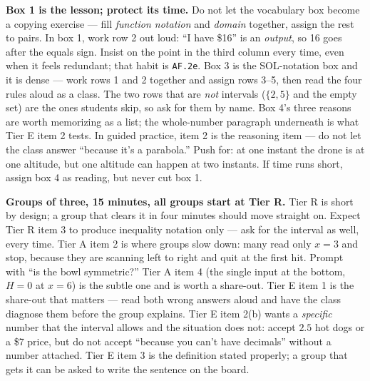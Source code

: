 \documentclass[10pt]{article}
\begin{document}
\boxguard[18]
\begin{teachernote}
    \textbf{Box 1 is the lesson; protect its time.} Do not let the vocabulary box become a copying
    exercise --- fill \emph{function notation} and \emph{domain} together, assign the rest to pairs.
    In box 1, work row 2 out loud: ``I have \$16'' is an \emph{output}, so 16 goes after the equals
    sign. Insist on the point in the third column every time, even when it feels redundant; that
    habit is \texttt{AF.2e}. Box 3 is the SOL-notation box and it is dense --- work rows 1 and 2
    together and assign rows 3--5, then read the four rules aloud as a class. The two rows that are
    \emph{not} intervals ($\{2,5\}$ and the empty set) are the ones students skip, so ask for them
    by name. Box 4's three reasons are worth memorizing as a list; the whole-number paragraph
    underneath is what Tier E item 2 tests. In guided practice, item 2 is the reasoning item ---
    do not let the class answer ``because it's a parabola.'' Push for: at one instant the drone is
    at one altitude, but one altitude can happen at two instants. If time runs short, assign box 4
    as reading, but never cut box 1.
\end{teachernote}

\boxguard[18]
\begin{teachernote}
    \textbf{Groups of three, 15 minutes, all groups start at Tier R.} Tier R is short by design; a
    group that clears it in four minutes should move straight on. Expect Tier R item 3 to produce
    inequality notation only --- ask for the interval as well, every time. Tier A item 2 is where
    groups slow down: many read only $x=3$ and stop, because they are scanning left to right and
    quit at the first hit. Prompt with ``is the bowl symmetric?'' Tier A item 4 (the single input
    at the bottom, $H=0$ at $x=6$) is the subtle one and is worth a share-out. Tier E item 1 is the
    share-out that matters --- read both wrong answers aloud and have the class diagnose them
    before the group explains. Tier E item 2(b) wants a \emph{specific} number that the interval
    allows and the situation does not: accept $2.5$ hot dogs or a \$7 price, but do not accept
    ``because you can't have decimals'' without a number attached. Tier E item 3 is the definition
    stated properly; a group that gets it can be asked to write the sentence on the board.
\end{teachernote}
\end{document}
